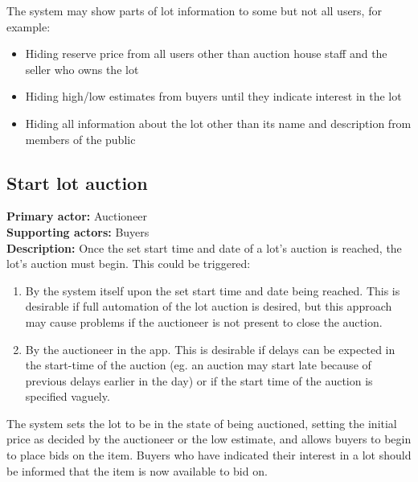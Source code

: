 \documentclass[titlepage, 12pt]{extarticle}
\begin{document}
The system may show parts of lot information to some but not all users, for example:
\begin{itemize}
  \item Hiding reserve price from all users other than auction house staff and the seller who owns the lot
  \item Hiding high/low estimates from buyers until they indicate interest in the lot
  \item Hiding all information about the lot other than its name and description from members of the public
\end{itemize}
\subsection{Start lot auction}
{\bf Primary actor: } Auctioneer
\\{\bf Supporting actors: } Buyers
\\{\bf Description: } Once the set start time and date of a lot's auction is reached, the lot's auction must begin. This could be triggered:
\begin{enumerate}
\item By the system itself upon the set start time and date being reached. This is desirable if full automation of the lot auction is desired, but this approach may cause problems if the auctioneer is not present to close the auction. 
\item By the auctioneer in the app. This is desirable if delays can be expected in the start-time of the auction (eg. an auction may start late because of previous delays earlier in the day) or if the start time of the auction is specified vaguely. 
\end{enumerate}

The system sets the lot to be in the state of being auctioned, setting the initial price as decided by the auctioneer or the low estimate, and allows buyers to begin to place bids on the item. Buyers who have indicated their interest in a lot should be informed that the item is now available to bid on.
\newpage
\end{document}
